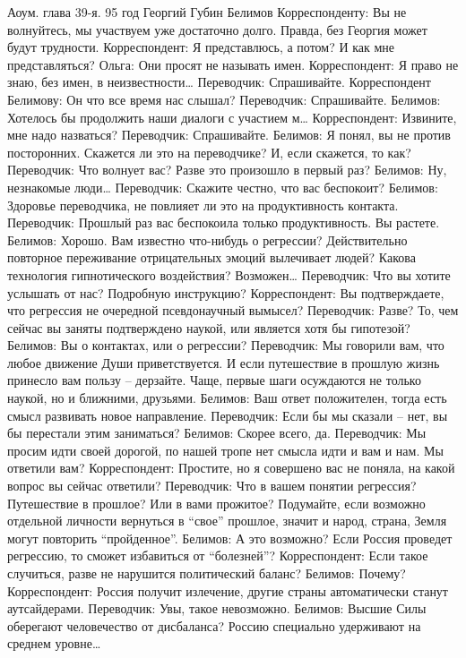 Аоум. глава 39-я. 95 год
Георгий Губин
Белимов Корреспонденту: Вы не волнуйтесь, мы участвуем уже достаточно долго. Правда, без Георгия может будут трудности.
Корреспондент: Я представлюсь, а потом? И как мне представляться? 
Ольга: Они просят не называть имен.
Корреспондент: Я право не знаю, без имен, в неизвестности…
Переводчик: Спрашивайте.
Корреспондент Белимову: Он что все время нас слышал?
Переводчик: Спрашивайте.
Белимов: Хотелось бы продолжить наши диалоги с участием м…
Корреспондент: Извините, мне надо назваться?
Переводчик: Спрашивайте.
Белимов: Я понял, вы не против посторонних. Скажется ли это на переводчике? И, если скажется, то как?
Переводчик: Что волнует вас? Разве это произошло в первый раз?
Белимов: Ну, незнакомые люди…
Переводчик: Скажите честно, что вас беспокоит?
Белимов: Здоровье переводчика, не повлияет ли это на продуктивность контакта.
Переводчик: Прошлый раз вас беспокоила только продуктивность. Вы растете.
Белимов: Хорошо. Вам известно что-нибудь о регрессии? Действительно повторное переживание отрицательных эмоций вылечивает людей? Какова технология гипнотического воздействия? Возможен…
Переводчик: Что вы хотите услышать от нас? Подробную инструкцию?
Корреспондент: Вы подтверждаете, что регрессия не очередной псевдонаучный вымысел?
Переводчик: Разве? То, чем сейчас вы заняты подтверждено наукой, или является хотя бы гипотезой?
Белимов: Вы о контактах, или о регрессии?
Переводчик: Мы говорили вам, что любое движение Души приветствуется. И если путешествие в прошлую жизнь принесло вам пользу – дерзайте. Чаще, первые шаги осуждаются не только наукой, но и ближними, друзьями.
Белимов: Ваш ответ положителен, тогда есть смысл развивать новое направление.
Переводчик: Если бы мы сказали – нет, вы бы перестали этим заниматься?
Белимов: Скорее всего, да.
Переводчик: Мы просим идти своей дорогой, по нашей тропе нет смысла идти и вам и нам. Мы ответили вам?
Корреспондент: Простите, но я совершено вас не поняла, на какой вопрос вы сейчас ответили?
Переводчик: Что в вашем понятии регрессия? Путешествие в прошлое? Или в вами прожитое? Подумайте, если возможно отдельной личности вернуться в ``свое'' прошлое, значит и народ, страна, Земля могут повторить ``пройденное''.
Белимов: А это возможно? Если Россия проведет регрессию, то сможет избавиться от ``болезней''?
Корреспондент: Если такое случиться, разве не нарушится политический баланс?
Белимов: Почему?
Корреспондент: Россия получит излечение, другие страны автоматически станут аутсайдерами.
Переводчик: Увы, такое невозможно.
Белимов: Высшие Силы оберегают человечество от дисбаланса? Россию специально удерживают на среднем уровне…
